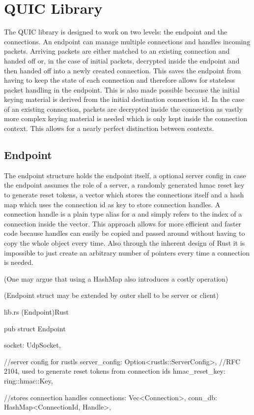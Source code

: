 \section{QUIC Library} \label{quic_lib}

The QUIC library is designed to work on two levels: the endpoint and the connections. An endpoint can manage multiple connections and handles incoming packets. Arriving packets are either matched to an existing connection and handed off or, in the case of initial packets, decrypted inside the endpoint and then handed off into a newly created connection. This saves the endpoint from having to keep the state of each connection and therefore allows for stateless packet handling in the endpoint. This is also made possible because the initial keying material is derived from the initial destination connection id. In the case of an existing connection, packets are decrypted inside the connection as vastly more complex keying material is needed which is only kept inside the connection context. This allows for a nearly perfect distinction between contexts. 

\subsection{Endpoint}

The endpoint structure holds the endpoint itself, a optional server config in case the endpoint assumes the role of a server, a randomly generated hmac reset key to generate reset tokens, a vector which stores the connections itself and a hash map which uses the connection id as key to store connection handles. A connection handle is a plain type alias for a  and simply refers to the index of a connection inside the vector. This approach allows for more efficient and faster code because handles can easily be copied and passed around without having to copy the whole  object every time. Also through the inherent design of Rust it is impossible to just create an arbitrary number of pointers every time a connection is needed. 

(One may argue that using a HashMap also introduces a costly operation)

(Endpoint struct may be extended by outer shell to be server or client)

\begin{codeblock}{lib.rs (Endpoint)}{Rust}
  \begin{rustcode}
    pub struct Endpoint {
        socket: UdpSocket,

        //server config for rustls
        server_config: Option<rustls::ServerConfig>,
        //RFC 2104, used to generate reset tokens from connection ids
        hmac_reset_key: ring::hmac::Key,

        //stores connection handles
        connections: Vec<Connection>,
        conn_db: HashMap<ConnectionId, Handle>,
    }
  \end{rustcode}
\end{codeblock}

